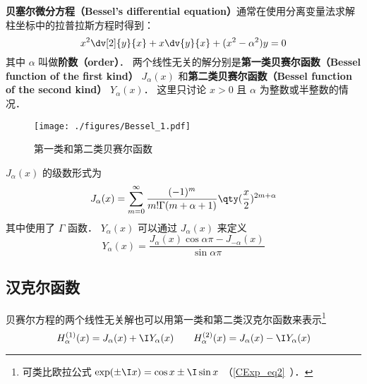 

\textbf{贝塞尔微分方程（Bessel's differential equation）}通常在使用分离变量法求解柱坐标中的拉普拉斯方程时得到：
\begin{equation}\label{Bessel_eq1}
x^2 \dv[2]{y}{x} + x\dv{y}{x} + (x^2 - \alpha ^2)y = 0
\end{equation}
其中 $\alpha$ 叫做\textbf{阶数（order）}． 两个线性无关的解分别是\textbf{第一类贝赛尔函数（Bessel function of the first kind）} $J_\alpha(x)$ 和\textbf{第二类贝赛尔函数（Bessel function of the second kind）} $Y_\alpha(x)$． 这里只讨论 $x > 0$ 且 $\alpha$ 为整数或半整数的情况．

\begin{figure}[ht]
\centering
\texttt{[image: ./figures/Bessel\_1.pdf]}
\caption{第一类和第二类贝赛尔函数} \label{Bessel_fig1}
\end{figure}

$J_\alpha(x)$ 的级数形式为
\begin{equation}
J_\alpha(x) = \sum_{m=0}^\infty \frac{(-1)^m}{m!\Gamma(m+\alpha+1)} \qty(\frac x2)^{2m+\alpha}
\end{equation}
其中使用了 $\Gamma$ 函数． $Y_\alpha(x)$ 可以通过 $J_\alpha(x)$ 来定义
\begin{equation}
Y_\alpha(x) = \frac{J_\alpha(x)\cos\alpha\pi - J_{-\alpha}(x)}{\sin\alpha\pi}
\end{equation}

\subsection{汉克尔函数}
贝赛尔方程的两个线性无关解也可以用第一类和第二类汉克尔函数来表示\footnote{可类比欧拉公式 $\exp(\pm\I x) = \cos x \pm \I\sin x$ （\autoref{CExp_eq2}~）．}
\begin{equation}
H_\alpha ^{(1)}(x) = J_\alpha(x) + \I Y_\alpha(x)
\qquad
H_\alpha ^{(2)}(x) = J_\alpha(x) - \I Y_\alpha(x)
\end{equation}

